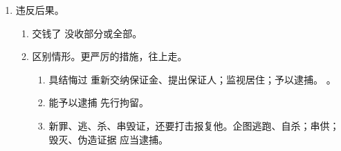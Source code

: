 \begin{enumerate}
\begin{enumerate}
        \end{enumerate}
  \item 违反后果。
        \begin{enumerate}
          \item 交钱了 \yjt 没收部分或全部。
          \item 区别情形。更严厉的措施，往上走。
                \begin{enumerate}
                  \item 具结悔过 \yjt 重新交纳保证金、提出保证人；监视居住；予以逮捕。
                        。
                  \item 能予以逮捕 \yjt 先行拘留。
                  \item 新罪、逃、杀、串毁证，还要打击报复他。企图逃跑、自杀；串供；毁灭、伪造证据 \yjt 应当逮捕。
                \end{enumerate}
        \end{enumerate}
\end{enumerate}

